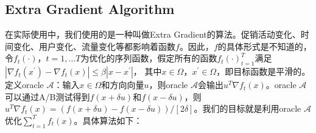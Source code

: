 \subsection{Extra Gradient Algorithm}
在实际使用中，我们使用的是一种叫做Extra Gradient的算法。促销活动变化、时间变化、用户变化、流量变化等都影响着函数$f$。因此，$f$的具体形式是不知道的，令$f_t(\cdot)，t=1,...T$为优化的序列函数，假定所有的函数${f_t(\cdot)}_{t=1}^T$满足$|\nabla f_t(x^{'}) - \nabla f_t(x)| \le \beta |x-x^{'}|$， 其中$x \in \Omega$，$x^{'} \in \Omega$，即目标函数是平滑的。定义oracle $\mathcal{A}$：输入$x \in \Omega$和方向向量$u$，则oracle $\mathcal{A}$会输出$u^T\nabla f_t(x)$。oracle $\mathcal{A}$可以通过A/B测试得到$f(x+\delta u)$和$f(x-\delta u)$，则$u^T\nabla f_t(x) = (f(x+\delta u)-f(x-\delta u))/[2\delta]$。我们的目标就是利用oracle $\mathcal{A}$优化$\sum_{t=1}^Tf_t(x)$。具体算法如下：
